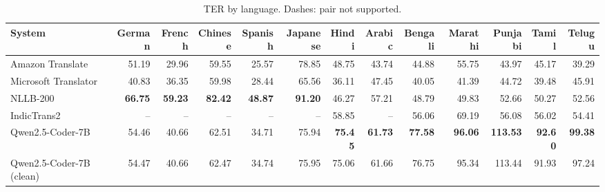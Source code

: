 \begin{table}[t]
\centering
\caption{TER by language. Dashes: pair not supported.\label{tab:ter_lang}}
\begin{tabular}{lrrrrrrrrrrrr}
\toprule
System & German & French & Chinese & Spanish & Japanese & Hindi & Arabic & Bengali & Marathi & Punjabi & Tamil & Telugu \\
\midrule
Amazon Translate & 51.19 & 29.96 & 59.55 & 25.57 & 78.85 & 48.75 & 43.74 & 44.88 & 55.75 & 43.97 & 45.17 & 39.29 \\
Microsoft Translator & 40.83 & 36.35 & 59.98 & 28.44 & 65.56 & 36.11 & 47.45 & 40.05 & 41.39 & 44.72 & 39.48 & 45.91 \\
NLLB-200 & \textbf{66.75} & \textbf{59.23} & \textbf{82.42} & \textbf{48.87} & \textbf{91.20} & 46.27 & 57.21 & 48.79 & 49.83 & 52.66 & 50.27 & 52.56 \\
IndicTrans2 & -- & -- & -- & -- & -- & 58.85 & -- & 56.06 & 69.19 & 56.08 & 56.02 & 54.41 \\
Qwen2.5-Coder-7B & 54.46 & 40.66 & 62.51 & 34.71 & 75.94 & \textbf{75.45} & \textbf{61.73} & \textbf{77.58} & \textbf{96.06} & \textbf{113.53} & \textbf{92.60} & \textbf{99.38} \\
Qwen2.5-Coder-7B (clean) & 54.47 & 40.66 & 62.47 & 34.74 & 75.95 & 75.06 & 61.66 & 76.75 & 95.34 & 113.44 & 91.93 & 97.24 \\
\bottomrule
\end{tabular}
\end{table}
